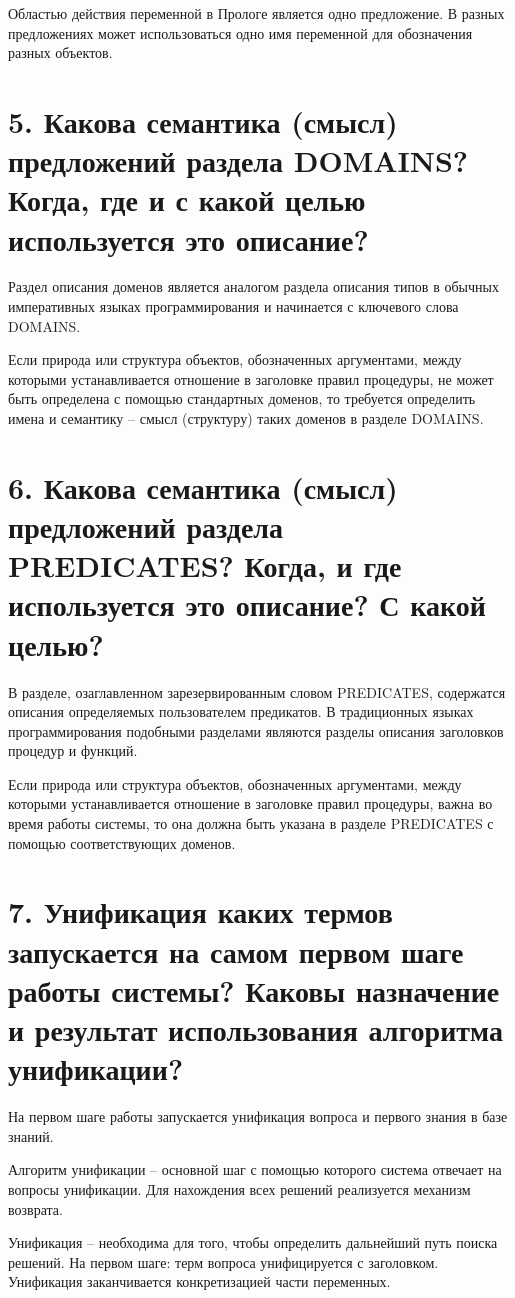 Областью действия переменной в Прологе является одно предложение. 
В разных предложениях может использоваться одно имя переменной для обозначения разных объектов.

\section*{5. Какова семантика (смысл) предложений раздела DOMAINS? Когда, где и с какой целью используется это описание?}
Раздел описания доменов является аналогом раздела описания типов в обычных императивных языках программирования и начинается с ключевого слова DOMAINS.

Если природа или структура объектов, обозначенных аргументами, между которыми устанавливается отношение в заголовке правил процедуры, не может быть определена с помощью стандартных доменов, то требуется определить имена и семантику – смысл (структуру) таких доменов в разделе DOMAINS.

\section*{6. Какова семантика (смысл) предложений раздела PREDICATES? Когда, и где используется это описание? С какой целью?}
В разделе, озаглавленном зарезервированным словом PREDICATES, содержатся описания определяемых пользователем предикатов. В традиционных языках программирования подобными разделами являются разделы описания заголовков процедур и функций.

Если природа или структура объектов, обозначенных аргументами, между которыми устанавливается отношение в заголовке правил процедуры, важна во время работы системы, то она должна быть указана в разделе PREDICATES с помощью соответствующих доменов. 

\section*{7. Унификация каких термов запускается на самом первом шаге работы системы? Каковы назначение и результат использования алгоритма унификации?}
На первом шаге работы запускается унификация вопроса и первого знания в базе знаний.

Алгоритм унификации – основной шаг с помощью которого система отвечает на вопросы унификации. Для
нахождения всех решений реализуется механизм возврата.

Унификация – необходима для того, чтобы определить дальнейший путь поиска решений. На первом шаге:
терм вопроса унифицируется с заголовком. Унификация заканчивается конкретизацией части переменных.

